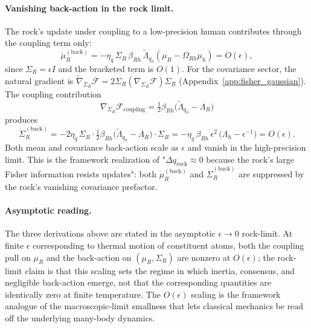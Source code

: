 \documentclass[11pt]{article}
\begin{document}
\paragraph{Vanishing back-action in the rock limit.} The rock's update under coupling to a low-precision human contributes through the coupling term only:
\begin{equation}
\dot{\mu}_R^{(\mathrm{back})} = -\eta_q\,\Sigma_R\,\beta_{Rh}\,\tilde{\Lambda}_{q_h}(\mu_R - \Omega_{Rh}\mu_h) = O(\epsilon),
\label{eq:rock_back_mu}
\end{equation}
since $\Sigma_R = \epsilon I$ and the bracketed term is $O(1)$. For the covariance sector, the natural gradient is $\tilde{\nabla}_{\Sigma_R}\mathcal{F} = 2\Sigma_R(\nabla_{\Sigma_R}\mathcal{F})\Sigma_R$ (Appendix~\ref{app:fisher_gaussian}). The coupling contribution
\begin{equation}
\nabla_{\Sigma_R}\mathcal{F}_{\mathrm{coupling}} = \tfrac{1}{2}\beta_{Rh}\big(\tilde{\Lambda}_{q_h} - \Lambda_R\big)
\end{equation}
produces
\begin{equation}
\dot{\Sigma}_R^{(\mathrm{back})} = -2\eta_q\,\Sigma_R \cdot \tfrac{1}{2}\beta_{Rh}\big(\tilde{\Lambda}_{q_h} - \Lambda_R\big)\cdot \Sigma_R = -\eta_q\,\beta_{Rh}\,\epsilon^2\,\big(\Lambda_h - \epsilon^{-1}\big) = O(\epsilon).
\label{eq:rock_back_sigma}
\end{equation}
Both mean and covariance back-action scale as $\epsilon$ and vanish in the high-precision limit. This is the framework realization of "$\Delta q_{\mathrm{rock}} \approx 0$ because the rock's large Fisher information resists updates": both $\dot{\mu}_R^{(\mathrm{back})}$ and $\dot{\Sigma}_R^{(\mathrm{back})}$ are suppressed by the rock's vanishing covariance prefactor.

\paragraph{Asymptotic reading.} The three derivations above are stated in the asymptotic $\epsilon \to 0$ rock-limit. At finite $\epsilon$ corresponding to thermal motion of constituent atoms, both the coupling pull on $\mu_R$ and the back-action on $(\mu_R, \Sigma_R)$ are nonzero at $O(\epsilon)$; the rock-limit claim is that this scaling sets the regime in which inertia, consensus, and negligible back-action emerge, not that the corresponding quantities are identically zero at finite temperature. The $O(\epsilon)$ scaling is the framework analogue of the macroscopic-limit smallness that lets classical mechanics be read off the underlying many-body dynamics.
\end{document}
